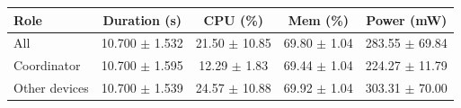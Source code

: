 \begin{tabular}{lcccc}
\hline
\textbf{Role} & \textbf{Duration (s)} & \textbf{CPU (\%)} & \textbf{Mem (\%)} & \textbf{Power (mW)} \\
\hline
All & 10.700 $\pm$ 1.532 & 21.50 $\pm$ 10.85 & 69.80 $\pm$ 1.04 & 283.55 $\pm$ 69.84 \\
Coordinator & 10.700 $\pm$ 1.595 & 12.29 $\pm$ 1.83 & 69.44 $\pm$ 1.04 & 224.27 $\pm$ 11.79 \\
Other devices & 10.700 $\pm$ 1.539 & 24.57 $\pm$ 10.88 & 69.92 $\pm$ 1.04 & 303.31 $\pm$ 70.00 \\
\hline
\end{tabular}
